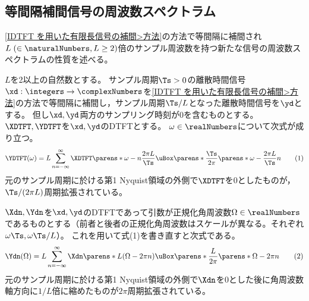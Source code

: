         \subsection{等間隔補間信号の周波数スペクトラム}
            \ref{IDTFT を用いた有限長信号の補間>方法}の方法で等間隔に補間され$L\;(\in\naturalNumbers,L\geq 2)$倍のサンプル周波数を持つ新たな信号の周波数スペクトラムの性質を述べる。
            \begin{shadebox}
                $L$を2以上の自然数とする。
                サンプル周期$\Ts>0$の離散時間信号$\xd:\integers\to\complexNumbers$を\ref{IDTFT を用いた有限長信号の補間>方法}の方法で等間隔に補間し，サンプル周期$\Ts/L$となった離散時間信号を$\yd$とする。
                但し$\xd,\yd$両方のサンプリング時刻が0を含むものとする。
                $\XDTFT,\YDTFT$を$\xd,\yd$のDTFTとする。
                $\omega\in\realNumbers$について次式が成り立つ。
                \[ \YDTFT(\omega) = L\sum_{n=-\infty}^\infty \XDTFT\parens*{\omega-n\frac{2\pi L}{\Ts}}\uBox\parens*{\frac{\Ts}{2\pi}\parens*{\omega-\frac{2\pi L}{\Ts}n}} \tag{1} \]
                元のサンプル周期に於ける第1 Nyquist領域の外側で$\XDTFT$を0としたものが，$\Ts/(2\pi L)$周期拡張されている。
                \par
                $\Xdn,\Ydn$を$\xd,\yd$のDTFTであって引数が正規化角周波数$\Omega\in\realNumbers$であるものとする（前者と後者の正規化角周波数はスケールが異なる。それぞれ$\omega\Ts,\omega\Ts/L$）。
                これを用いて式(1)を書き直すと次式である。
                \[ \Ydn(\Omega) = L\sum_{n=-\infty}^\infty \Xdn\parens*{L(\Omega-2\pi n)}\uBox\parens*{\frac{L}{2\pi}\parens*{\Omega-2\pi n}} \tag{2} \]
                元のサンプル周期に於ける第1 Nyquist領域の外側で$\Xdn$を0とした後に角周波数軸方向に$1/L$倍に縮めたものが$2\pi$周期拡張されている。
            \end{shadebox}
